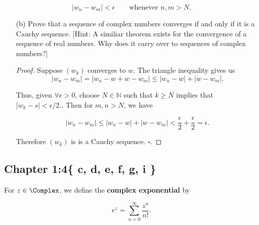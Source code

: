 $$
|w_n-w_m| < \epsilon
\quad\quad
\text{whenever }
n,m > N.
$$

\begin{enumerate}[label=(\alph*)]
    \item[(b)] Prove that a sequence of complex numbers converges if and only if it is a Cauchy
        sequence. [Hint: A similiar theorem exists for the convergence of a sequence of
        real numbers. Why does it carry over to sequences of complex numbers?]

        \begin{proof}
            Suppose $(w_k)$ converges to $w$. The triangle inequality gives us
            $$
            |w_n-w_m|=|w_n-w+w-w_m|\leq |w_n-w| + |w-w_m|.
            $$

            Thus, given $\forall \epsilon > 0$, choose $N\in\mathbb{N}$ such that
            $k\geq N$ implies that $|w_k-s| < \epsilon/2.$. Then for $m,n>N$, we have

            $$
            |w_n-w_m| \leq |w_n-w|+ |w-w_m| < \frac{\epsilon}{2}+\frac{\epsilon}{2}=\epsilon.
            $$

            Therefore $(w_k)$ is is a Cauchy sequence. $\square$.
        \end{proof}
\end{enumerate}

\newpage

\subsection{Chapter 1:4\{ c, d, e, f, g, i \}}

For $z\in\Complex$, we define the \textbf{complex exponential} by

$$
e^z = \sum_{n=0}^\infty \frac{z^n}{n!}.
$$

